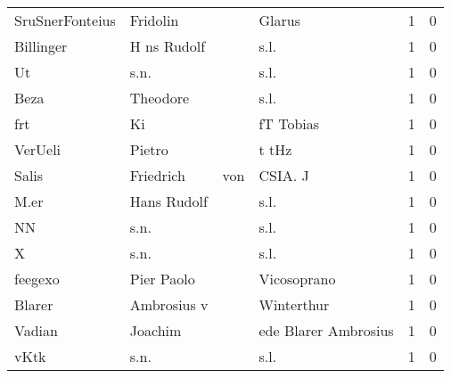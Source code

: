 \begin{tabular}{llllrr}
          SruSnerFonteius &                           Fridolin &             &                                      Glarus &          1 &         0 \\
                Billinger &                        H ns Rudolf &             &                                        s.l. &          1 &         0 \\
                       Ut &                               s.n. &             &                                        s.l. &          1 &         0 \\
                     Beza &                           Theodore &             &                                        s.l. &          1 &         0 \\
                      frt &                                 Ki &             &                                   fT Tobias &          1 &         0 \\
                  VerUeli &                             Pietro &             &                                       t tHz &          1 &         0 \\
                    Salis &                          Friedrich &         von &                                     CSIA. J &          1 &         0 \\
                     M.er &                        Hans Rudolf &             &                                        s.l. &          1 &         0 \\
                       NN &                               s.n. &             &                                        s.l. &          1 &         0 \\
                        X &                               s.n. &             &                                        s.l. &          1 &         0 \\
                  feegexo &                         Pier Paolo &             &                                 Vicosoprano &          1 &         0 \\
                   Blarer &                        Ambrosius v &             &                                  Winterthur &          1 &         0 \\
                   Vadian &                            Joachim &             &                        ede Blarer Ambrosius &          1 &         0 \\
                     vKtk &                               s.n. &             &                                        s.l. &          1 &         0 \\

\end{tabular}
